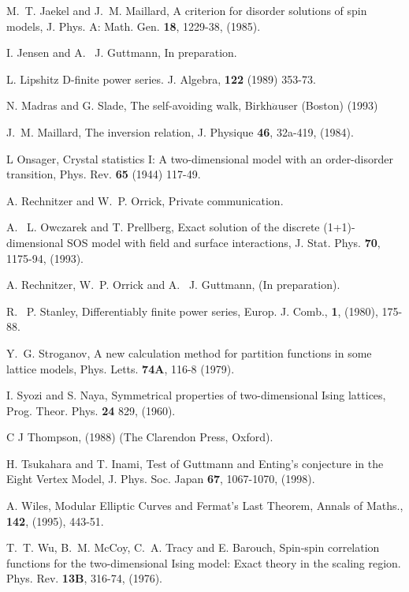 \begin{thebibliography}{10}
M.~T. Jaekel and J.~M. Maillard,
\newblock A criterion for disorder solutions of spin models, 
J. Phys. A: Math. Gen. {\bf 18}, 1229-38, (1985).

I. Jensen and A. ~J. Guttmann,
\newblock In preparation.

L. Lipshitz
\newblock D-finite power series. J. Algebra, {\bf 122} (1989) 353-73. 

N. Madras and G. Slade,
\newblock The self-avoiding walk, Birkh$\ddot{a}$user (Boston) (1993)

J.~M. Maillard,
\newblock The inversion relation, J. Physique {\bf 46},  32a-419, (1984).

L Onsager,
\newblock Crystal statistics I: A two-dimensional model with
an order-disorder transition, Phys. Rev. {\bf 65} (1944) 117-49.

A. Rechnitzer and W.~P. Orrick,
\newblock Private communication.

  A. ~L. Owczarek and T. Prellberg, 
  \newblock Exact solution of the discrete (1+1)-dimensional SOS
  model with field and surface interactions, 
  J. Stat. Phys. {\bf 70}, 1175-94, (1993).


A. Rechnitzer, W.~P. Orrick and A. ~J. Guttmann,
\newblock (In preparation).

R. ~P. Stanley,
\newblock Differentiably finite power series, Europ. J. Comb., {\bf 1}, (1980), 175-88.

Y.~G. Stroganov,
\newblock A new calculation method for partition functions in
some lattice models, Phys. Letts. {\bf 74A}, 116-8 (1979).

  I. Syozi and S. Naya,
  \newblock Symmetrical properties of two-dimensional Ising lattices,
  Prog. Theor. Phys. {\bf 24} 829, (1960).

C J Thompson,
 (1988)
(The Clarendon Press, Oxford).

 H. Tsukahara and T. Inami,
 \newblock Test of Guttmann and Enting's conjecture in the
 Eight Vertex Model, J. Phys. Soc. Japan {\bf 67}, 1067-1070,
(1998).

A. Wiles,
\newblock Modular Elliptic Curves and Fermat's Last Theorem,
Annals of Maths., {\bf 142}, (1995), 443-51.

  T.~T. Wu, B.~M. McCoy, C.~A. Tracy and E. Barouch,
  \newblock Spin-spin correlation functions for the two-dimensional
  Ising model: Exact theory in the scaling region. 
  Phys. Rev. {\bf 13B}, 316-74, (1976).






\end{thebibliography}


